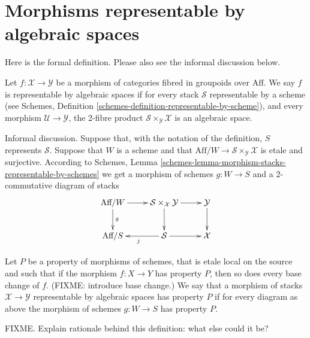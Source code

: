 \section{Morphisms representable by algebraic spaces}
\label{section-morphism-representable-by-algebraic-spaces}

\noindent
Here is the formal definition. Please also see the informal discussion below.

\begin{definition}
\label{definition-representable-by-algebraic-spaces}
Let $f : \mathcal{X} \to \mathcal{Y}$ be a morphism of categories
fibred in groupoids over $\text{Aff}$. We say $f$ is representable by
algebraic spaces if for every stack $\mathcal{S}$ representable by a scheme
(see Schemes, Definition \ref{schemes-definition-representable-by-scheme}),
and every morphism $\mathcal{U} \to \mathcal{Y}$, the 2-fibre product
$\mathcal{S}\times_\mathcal{Y}\mathcal{X}$ is an algebraic space.
\end{definition}

\noindent
Informal discussion. Suppose that, with the notation of the definition,
$S$ represents $\mathcal{S}$. Suppose that $W$ is a scheme and that
$\text{Aff}/W \to \mathcal{S}\times_\mathcal{Y}\mathcal{X}$ is 
etale and surjective. According to
Schemes, Lemma \ref{schemes-lemma-morphism-stacks-representable-by-schemes}
we get a morphism of schemes $g : W \to S$ and a 2-commutative diagram
of stacks
$$
\xymatrix{
\text{Aff}/W \ar[d]^g \ar[r] &
\mathcal{S}\times_\mathcal{X}\mathcal{Y} \ar[d] \ar[r] &
\mathcal{Y} \ar[d] \\
\text{Aff}/S &
\mathcal{S} \ar[l]^j \ar[r] & \mathcal{X}
}
$$

\begin{definition}
\label{definition-property-morphism-representable-by-algebraic-spaces}
Let $P$ be a property of morphisms of schemes, that is etale local
on the source and such that if the morphism $f : X \to Y$ has property $P$,
then so does every base change of $f$. (FIXME: introduce base change.)
We say that a morphism of stacks $\mathcal{X}
\to \mathcal{Y}$ representable by algebraic spaces has property
$P$ if for every diagram as above the morphism of schemes
$g : W \to S$ has property $P$.
\end{definition}

\noindent
FIXME. Explain rationale behind this definition: what else could it be?







